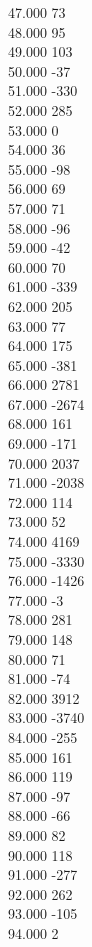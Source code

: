 { 47.000	73 \\
 48.000	95 \\
 49.000	103 \\
 50.000	-37 \\
 51.000	-330 \\
 52.000	285 \\
 53.000	0 \\
 54.000	36 \\
 55.000	-98 \\
 56.000	69 \\
 57.000	71 \\
 58.000	-96 \\
 59.000	-42 \\
 60.000	70 \\
 61.000	-339 \\
 62.000	205 \\
 63.000	77 \\
 64.000	175 \\
 65.000	-381 \\
 66.000	2781 \\
 67.000	-2674 \\
 68.000	161 \\
 69.000	-171 \\
 70.000	2037 \\
 71.000	-2038 \\
 72.000	114 \\
 73.000	52 \\
 74.000	4169 \\
 75.000	-3330 \\
 76.000	-1426 \\
 77.000	-3 \\
 78.000	281 \\
 79.000	148 \\
 80.000	71 \\
 81.000	-74 \\
 82.000	3912 \\
 83.000	-3740 \\
 84.000	-255 \\
 85.000	161 \\
 86.000	119 \\
 87.000	-97 \\
 88.000	-66 \\
 89.000	82 \\
 90.000	118 \\
 91.000	-277 \\
 92.000	262 \\
 93.000	-105 \\
 94.000	2 \\
}
